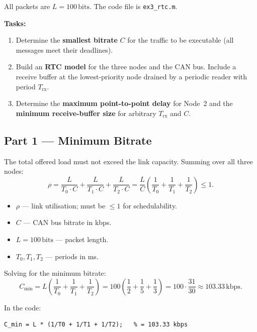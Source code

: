 \documentclass[12pt, a4paper]{article}
\begin{document}
All packets are $L = 100\,\text{bits}$.
The code file is \texttt{ex3\_rtc.m}.

\textbf{Tasks:}
\begin{enumerate}[leftmargin=1.6em, itemsep=3pt]
  \item Determine the \textbf{smallest bitrate} $C$ for the traffic to be
    executable (all messages meet their deadlines).
  \item Build an \textbf{RTC model} for the three nodes and the CAN bus.
    Include a receive buffer at the lowest-priority node drained by a periodic
    reader with period $T_\mathrm{rx}$.
  \item Determine the \textbf{maximum point-to-point delay} for Node~2 and
    the \textbf{minimum receive-buffer size} for arbitrary $T_\mathrm{rx}$
    and $C$.
\end{enumerate}

\subsection*{Part 1 --- Minimum Bitrate}

The total offered load must not exceed the link capacity.
Summing over all three nodes:
\[
  \rho = \frac{L}{T_0 \cdot C} + \frac{L}{T_1 \cdot C} + \frac{L}{T_2 \cdot C}
       = \frac{L}{C}\left(\frac{1}{T_0} + \frac{1}{T_1} + \frac{1}{T_2}\right) \leq 1.
\]
\begin{itemize}[leftmargin=1.4em, itemsep=2pt]
  \item $\rho$ --- link utilisation; must be $\leq 1$ for schedulability.
  \item $C$ --- CAN bus bitrate in kbps.
  \item $L = 100\,\text{bits}$ --- packet length.
  \item $T_0, T_1, T_2$ --- periods in ms.
\end{itemize}

Solving for the minimum bitrate:
\[
  C_\mathrm{min} = L\!\left(\frac{1}{T_0} + \frac{1}{T_1} + \frac{1}{T_2}\right)
                 = 100\!\left(\frac{1}{2} + \frac{1}{5} + \frac{1}{3}\right)
                 = 100 \cdot \frac{31}{30}
                 \approx 103.33\,\text{kbps}.
\]

In the code:
\begin{lstlisting}[style=matlab]
C_min = L * (1/T0 + 1/T1 + 1/T2);   % = 103.33 kbps
\end{lstlisting}
\end{document}

